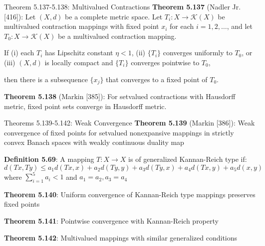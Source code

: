 \documentclass[aspectratio=169,10pt]{beamer}
\begin{document}
\begin{frame}{Theorem 5.137-5.138: Multivalued Contractions}
    \textbf{Theorem 5.137} (Nadler Jr. [416]): Let $(X, d)$ be a complete metric space. Let $T_i: X \to \mathcal{K}(X)$ be multivalued contraction mappings with fixed point $x_i$ for each $i = 1, 2, \ldots$, and let $T_0: X \to \mathcal{K}(X)$ be a multivalued contraction mapping.

    \medskip

    If (i) each $T_i$ has Lipschitz constant $\eta < 1$, (ii) $\{T_i\}$ converges uniformly to $T_0$, or (iii) $(X, d)$ is locally compact and $\{T_i\}$ converges pointwise to $T_0$,

    then there is a subsequence $\{x_j\}$ that converges to a fixed point of $T_0$.

    \medskip

    \textbf{Theorem 5.138} (Markin [385]): For setvalued contractions with Hausdorff metric, fixed point sets converge in Hausdorff metric.
\end{frame}

\begin{frame}{Theorems 5.139-5.142: Weak Convergence}
    \textbf{Theorem 5.139} (Markin [386]): Weak convergence of fixed points for setvalued nonexpansive mappings in strictly convex Banach spaces with weakly continuous duality map

    \medskip

    \textbf{Definition 5.69}: A mapping $T: X \to X$ is of \alert{generalized Kannan-Reich type} if:
    \[
    d(Tx, Ty) \leq a_1 d(Tx, x) + a_2 d(Ty, y) + a_3 d(Ty, x) + a_4 d(Tx, y) + a_5 d(x, y)
    \]
    where $\sum_{i=1}^5 a_i < 1$ and $a_1 = a_2, a_3 = a_4$

    \medskip

    \textbf{Theorem 5.140}: Uniform convergence of Kannan-Reich type mappings preserves fixed points

    \textbf{Theorem 5.141}: Pointwise convergence with Kannan-Reich property

    \textbf{Theorem 5.142}: Multivalued mappings with similar generalized conditions
\end{frame}
\end{document}
